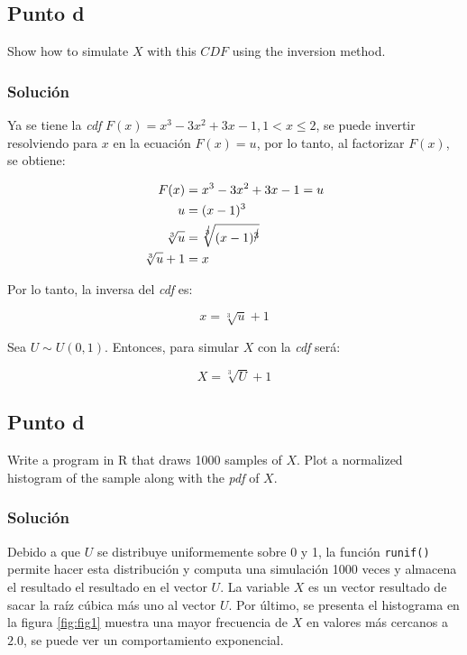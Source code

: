 \documentclass[12pt]{article}
\begin{document}
\subsection{Punto d}

Show how to simulate $X$ with this $CDF$ using the inversion method.

\subsubsection{Solución}

Ya se tiene la \textit{cdf} $F(x) = x^{3} - 3x^{2} + 3x - 1, 1 < x \leq 2$, se puede invertir resolviendo para $x$ en la ecuación $F(x) = u$, por lo tanto, al factorizar $F(x)$, se obtiene:

\begin{align*}
  F(x) &= x^{3} - 3x^{2} + 3x - 1 = u\\
     u &= (x-1)^{3} \\
  \sqrt[3]{u} &= \sqrt[\cancel{3}]{(x-1)^{\cancel{3}}} \\
  \sqrt[3]{u} + 1 &= x
\end{align*}

Por lo tanto, la inversa del \textit{cdf} es:

\[
  x = \sqrt[3]{u} + 1
\]

Sea $U \sim U(0, 1)$. Entonces, para simular $X$ con la \textit{cdf} será:

\[
X = \sqrt[3]{U} + 1
\]


\subsection{Punto d}

Write a program in \textsf{R} that draws 1000 samples of $X$. Plot a normalized histogram of the sample along with the \textit{pdf} of $X$.

\subsubsection{Solución}

Debido a que $U$ se distribuye uniformemente sobre 0 y 1, la función \lstinline|runif()| permite hacer esta distribución y computa una simulación 1000 veces y almacena el resultado el resultado en el vector $U$. La variable $X$ es un vector resultado de sacar la raíz cúbica más uno al vector $U$. Por último, se presenta el histograma en la figura \ref{fig:fig1} muestra una mayor frecuencia de $X$ en valores más cercanos a $2.0$, se puede ver un comportamiento exponencial.
\end{document}
